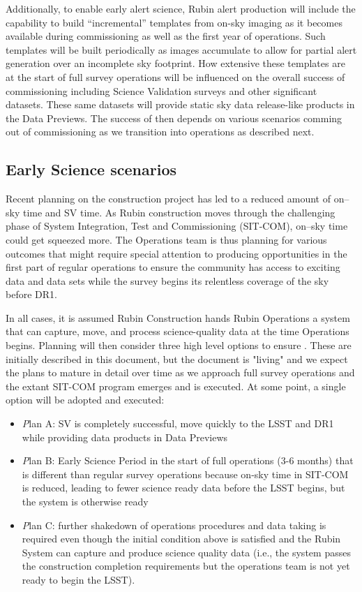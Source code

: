 Additionally, to enable early alert science, Rubin alert production will include the capability to build ``incremental'' templates from on-sky imaging as it becomes available during commissioning as well as the first year of operations. 
Such templates will be built periodically as images accumulate to allow for partial alert generation over an incomplete sky footprint.
How extensive these templates are at the start of full survey operations will be influenced on the overall success of commissioning including Science Validation surveys and other significant datasets. These same datasets will provide static sky data release-like products in the Data Previews. The success of \es then depends on various scenarios comming out of commissioning as we transition into operations as described next.   

\subsection{Early Science scenarios } \label{ssec:scenarios}
Recent planning on the construction project has led to a reduced amount of on--sky time and SV time.
As Rubin construction moves through the challenging phase of System Integration, Test and Commissioning (SIT-COM), on--sky time could get squeezed more. The Operations team is thus planning for various outcomes that might require special attention to producing \es opportunities in the first part of regular operations to ensure the community has access to exciting data and data sets while the survey begins its relentless coverage of the sky before DR1.

In all cases, it is assumed Rubin Construction hands Rubin Operations a system that can capture, move, and process science-quality data at the time Operations begins. Planning will then consider three high level options to ensure \es. These are initially described in this document, but the document is "living" and we expect the plans to mature in detail over time as we approach full survey operations and the extant SIT-COM program emerges and is executed. At some point, a single option will be adopted and executed:

\begin{itemize}
\item {\textit Plan A:} SV is completely successful, move quickly to the LSST and DR1 while providing \es data products in Data Previews
\item {\textit Plan B:} Early Science Period in the start of full operations (3-6 months) that is different than regular survey operations because on-sky time in SIT-COM is reduced, leading to fewer science ready data before the LSST begins, but the system is otherwise ready
\item {\textit Plan C:} further shakedown of operations procedures and data taking is required even though the initial condition above is satisfied and the Rubin System can capture and produce science quality data (i.e., the system passes the construction completion requirements but the operations team is not yet ready to begin the LSST).

\end{itemize}

